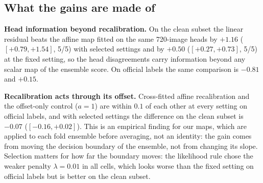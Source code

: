 \begin{table}[t]
\centering\small
\caption{Per-group test accuracy (\%) of full-validation DPE and three post-hoc procedures on official labels and on the clean subset (90 mislabelled images removed). Standard ERM, mean over ten split seeds and five backbones; the lowest group in each row is in bold.}
\label{tab:groups}
\end{table}

\subsection{What the gains are made of}
\textbf{Head information beyond recalibration.} On the clean subset the linear residual beats the affine map fitted on the same 720-image heads by $+1.16$\pp{} ($[+0.79,+1.54]$, 5/5) with selected settings and by $+0.50$\pp{} ($[+0.27,+0.73]$, 5/5) at the fixed setting, so the head disagreements carry information beyond any scalar map of the ensemble score. On official labels the same comparison is $-0.81$ and $+0.15$\pp.

\textbf{Recalibration acts through its offset.} Cross-fitted affine recalibration and the offset-only control ($a=1$) are within $0.1$\pp{} of each other at every setting on official labels, and with selected settings the difference on the clean subset is $-0.07$\pp{} ($[-0.16,+0.02]$). This is an empirical finding for our maps, which are applied to each fold ensemble before averaging, not an identity: the gain comes from moving the decision boundary of the ensemble, not from changing its slope. Selection matters for how far the boundary moves: the likelihood rule chose the weaker penalty $\lambda=0.01$ in all cells, which looks worse than the fixed setting on official labels but is better on the clean subset.


